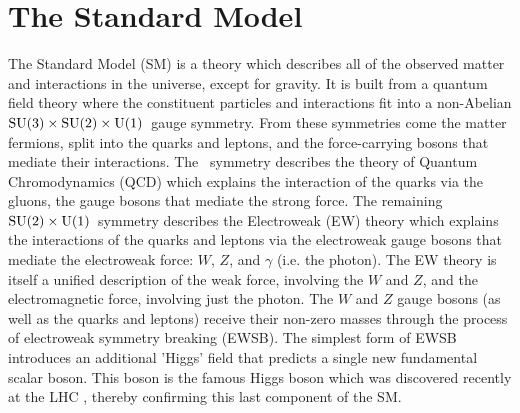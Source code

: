 






\section{The Standard Model}

The Standard Model (SM) is a theory which describes all of the
observed matter and interactions in the universe, except for gravity.
It is built from a quantum field theory where the constituent particles
and interactions fit into a non-Abelian 
$\textrm{SU(3)}\times\textrm{SU(2)}\times\textrm{U(1)}$~gauge symmetry.
From these symmetries come the matter fermions, split 
into the quarks and leptons, and the force-carrying bosons
that mediate their interactions.
The \suthree~symmetry describes the theory of Quantum Chromodynamics (QCD)
which explains the interaction of the quarks via the gluons, the
gauge bosons that mediate the strong force.
The remaining $\textrm{SU(2)}\times\textrm{U(1)}$~symmetry 
describes the Electroweak (EW) theory which explains
the interactions of the quarks and leptons via the 
electroweak gauge bosons that mediate
the electroweak force: $W$, $Z$, and $\gamma$ (i.e. the photon).
The EW theory is itself a unified description of the weak force,
involving the $W$ and $Z$, and the electromagnetic force, involving
just the photon.
The $W$ and $Z$ gauge bosons (as well as the quarks and leptons) receive
their non-zero masses through the process of electroweak symmetry
breaking (EWSB). The simplest form of EWSB
introduces an additional 'Higgs' field that
predicts a single new fundamental scalar boson. This boson is the
famous Higgs boson which was discovered recently at the 
LHC \cite{Aad20121,Chatrchyan:2012xdj}, thereby
confirming this last component of the SM.

